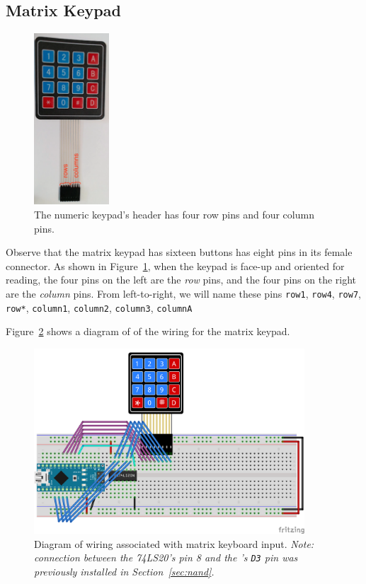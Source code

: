 
\newpage

\subsection{Matrix Keypad}

\begin{figure}
    \centering
    \includegraphics[width=0.25\textwidth]{keypad-annotated}
    \caption{The numeric keypad's header has four row pins and four column pins.\label{fig:keypad-annotated}}
\end{figure}

Observe that the matrix keypad has sixteen buttons has eight pins in its female
connector. As shown in Figure~\ref{fig:keypad-annotated}, when the keypad is
face-up and oriented for reading, the four pins on the left are the
\textit{row} pins, and the four pins on the right are the \textit{column} pins.
From left-to-right, we will name these pins \texttt{row1}, \texttt{row4},
\texttt{row7}, \texttt{row*}, \texttt{column1}, \texttt{column2},
\texttt{column3}, \texttt{columnA}

Figure~\ref{fig:keypad-diagram} shows a diagram of of the wiring for the
matrix keypad.

\begin{figure}[p]
    \centering
    \includegraphics[width=0.9\textwidth]{fritzing_images/keypad}
    \caption{Diagram of wiring associated with matrix keyboard input.
        \textit{Note: connection between the 74LS20's pin 8 and the \nano's
        \texttt{D3} pin was previously installed in Section~\ref{sec:nand}.}
        \label{fig:keypad-diagram}}
\end{figure}

